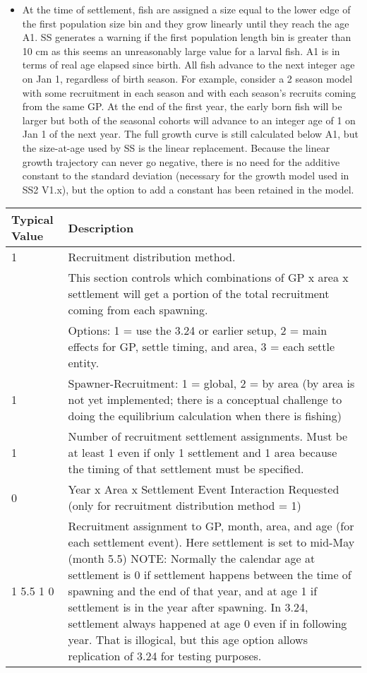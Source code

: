 \begin{description}
\begin{itemize}
		\item At the time of settlement, fish are assigned a size equal to the lower edge of the first population size bin and they grow linearly until they reach the age A1.  SS generates a warning if the first population length bin is greater than 10 cm as this seems an unreasonably large value for a larval fish.  A1 is in terms of real age elapsed since birth.  All fish advance to the next integer age on Jan 1, regardless of birth season.  For example, consider a 2 season model with some recruitment in each season and with each season’s recruits coming from the same GP.  At the end of the first year, the early born fish will be larger but both of the seasonal cohorts will advance to an integer age of 1 on Jan 1 of the next year.  The full growth curve is still calculated below A1, but the size-at-age used by SS is the linear replacement.  Because the linear growth trajectory can never go negative, there is no need for the additive constant to the standard deviation (necessary for the growth model used in SS2 V1.x), but the option to add a constant has been retained in the model.
	\end{itemize}
\end{description}
	
\begin{longtable}{p{0.5cm} p{2cm} p{12cm}}
	\multicolumn{2}{l}{Typical Value} & Description \\
	\hline		
	1 & & Recruitment distribution method.  \\
		& &  This section controls which combinations of GP x area x settlement will get a portion of the total recruitment coming from each spawning.  \\
		& &  Options: 1 = use the 3.24 or earlier setup, 2 = main effects for GP, settle timing, and area, 3 = each settle entity.\\
	\hline
	1 & & Spawner-Recruitment: 1 = global, 2 = by area (by area is not yet implemented; there is a conceptual challenge to doing the equilibrium calculation when there is fishing)\\
	\hline
	1 & & Number of recruitment settlement assignments.  Must be at least 1 even if only 1 settlement and 1 area because the timing of that settlement must be specified.\\
	\hline
	0 & & Year x Area x Settlement Event Interaction Requested (only for recruitment distribution method = 1)\\
	\hline
	\multicolumn{2}{l}{1 5.5 1 0}& Recruitment assignment to GP, month, area, and age (for each settlement event).  Here settlement is set to mid-May (month 5.5) NOTE:  Normally the calendar age at settlement is 0 if settlement happens between the time of spawning and the end of that year, and at age 1 if settlement is in the year after spawning.  In 3.24, settlement always happened at age 0 even if in following year.  That is illogical, but this age option allows replication of 3.24 for testing purposes.
	\\
	\hline
\end{longtable}



